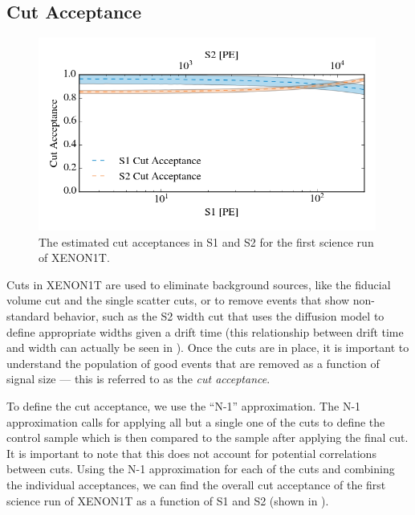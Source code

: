  

\subsection{Cut Acceptance}
\label{sec:xe1t_cut_acceptance}

\begin{figure}[t]
	\centering
	\includegraphics[width=0.99\textwidth]{xe1t_cut_acceptances}
	\caption{The estimated cut acceptances in S1 and S2 for the first science run of XENON1T.}
	\label{fig:xe1t_cut_acceptances}
\end{figure}


Cuts in XENON1T are used to eliminate background sources, like the fiducial volume cut and the single scatter cuts, or to remove events that show non-standard behavior, such as the S2 width cut that uses the diffusion model to define appropriate widths given a drift time (this relationship between drift time and width can actually be seen in ).  Once the cuts are in place, it is important to understand the population of good events that are removed as a function of signal size --- this is referred to as the \textit{cut acceptance}.  

To define the cut acceptance, we use the ``N-1'' approximation.  The N-1 approximation calls for applying all but a single one of the cuts to define the control sample which is then compared to the sample after applying the final cut.  It is important to note that this does not account for potential correlations between cuts.  Using the N-1 approximation for each of the cuts and combining the individual acceptances, we can find the overall cut acceptance of the first science run of XENON1T as a function of S1 and S2 (shown in ).

